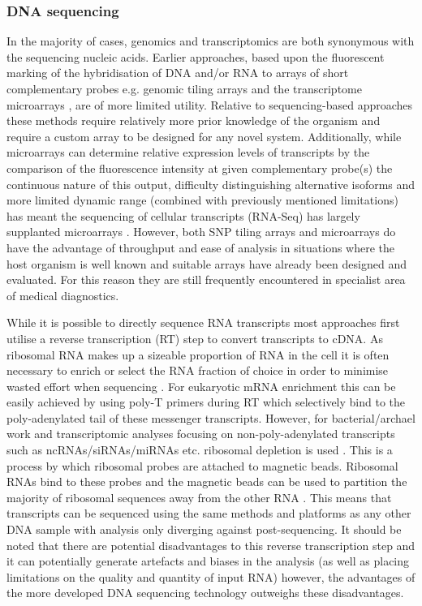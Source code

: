 \subsubsection{DNA sequencing}

In the majority of cases, genomics and transcriptomics are both synonymous with
the sequencing nucleic acids. Earlier approaches, based upon the fluorescent
marking of the hybridisation of DNA and/or RNA to arrays of short complementary probes 
e.g. genomic tiling arrays and the transcriptome microarrays \citep{Mockler2005}, are of more
limited utility.   Relative to sequencing-based approaches these methods
require relatively more prior knowledge of the organism and require a custom array to be
designed for any novel system. Additionally, while microarrays can determine relative expression levels
of transcripts by the comparison of the fluorescence intensity at given complementary probe(s)
the continuous nature of this output, difficulty distinguishing alternative isoforms 
and more limited dynamic range (combined with previously mentioned limitations) 
has meant the sequencing of cellular transcripts (RNA-Seq) has largely supplanted microarrays \citep{Wang2009}.
However, both SNP tiling arrays and microarrays do have the advantage of throughput and ease of analysis
in situations where the host organism is well known and suitable arrays have already been designed
and evaluated.  For this reason they are still frequently encountered in specialist area of medical 
diagnostics.


While it is possible to directly sequence RNA transcripts \citep{Ozsolak2009} most approaches first utilise a reverse transcription (RT)
step to convert transcripts to cDNA. As ribosomal RNA makes up a sizeable proportion of RNA in the cell
it is often necessary to enrich or select the RNA fraction of choice in order to minimise wasted effort when
sequencing \citep{Wilhelm2009}.  For eukaryotic mRNA enrichment this can be easily achieved by
using poly-T primers during RT which selectively bind to the poly-adenylated tail of these messenger 
transcripts.  However, for bacterial/archael work and transcriptomic analyses focusing on non-poly-adenylated
transcripts such as ncRNAs/siRNAs/miRNAs etc. ribosomal depletion is used \citep{ONeil2013}.  This is a process by which 
ribosomal probes are attached to magnetic beads. Ribosomal RNAs bind to these probes and the magnetic
beads can be used to partition the majority of ribosomal sequences away from the other RNA \citep{ONeil2013}.
This means that transcripts can be sequenced using the same methods and platforms as any other DNA sample with analysis only diverging against post-sequencing.
It should be noted that there are potential disadvantages to this reverse transcription step and it
can potentially generate artefacts and biases in the analysis (as well as placing limitations on the quality
and quantity of input RNA) \citep{Ozsolak2011} however, the advantages of the more developed DNA sequencing technology outweighs these
disadvantages.

